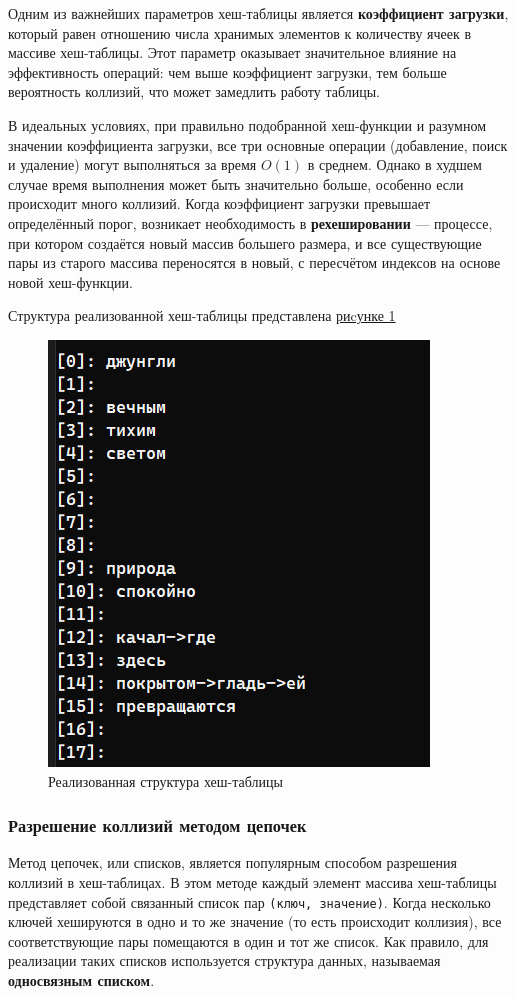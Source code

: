 \documentclass[11pt,a4paper,final]{article} %
\begin{document}
Одним из важнейших параметров хеш-таблицы является \textbf{коэффициент загрузки}, который равен отношению числа хранимых элементов к количеству ячеек в массиве хеш-таблицы. Этот параметр оказывает значительное влияние на эффективность операций: чем выше коэффициент загрузки, тем больше вероятность коллизий, что может замедлить работу таблицы.

В идеальных условиях, при правильно подобранной хеш-функции и разумном значении коэффициента загрузки, все три основные операции (добавление, поиск и удаление) могут выполняться за время $O(1)$ в среднем. Однако в худшем случае время выполнения может быть значительно больше, особенно если происходит много коллизий. Когда коэффициент загрузки превышает определённый порог, возникает необходимость в \textbf{рехешировании} — процессе, при котором создаётся новый массив большего размера, и все существующие пары из старого массива переносятся в новый, с пересчётом индексов на основе новой хеш-функции.

Структура реализованной хеш-таблицы представлена \hyperref[fig:hash]{риcунке 1} 
\newpage

\begin{figure}[H]
	\centering
	\includegraphics[width=0.5\linewidth]{img/hash.png}
	\caption{Реализованная структура хеш-таблицы}
	\label{fig:hash}
\end{figure}
 

\subsubsection{Разрешение коллизий методом цепочек}

Метод цепочек, или списков, является популярным способом разрешения коллизий в хеш-таблицах. В этом методе каждый элемент массива хеш-таблицы представляет собой связанный список пар \texttt{(ключ, значение)}. Когда несколько ключей хешируются в одно и то же значение (то есть происходит коллизия), все соответствующие пары помещаются в один и тот же список. Как правило, для реализации таких списков используется структура данных, называемая \textbf{односвязным списком}.
\end{document}
